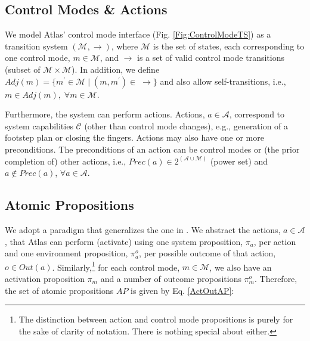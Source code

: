 
\subsection{Control Modes \& Actions}\label{S:CMActions}

We model Atlas' control mode interface (Fig. \ref{Fig:ControlModeTS}) as a transition system $(\mathcal{M}, \boldsymbol\rightarrow)$, where $\mathcal{M}$ is the set of states, each corresponding to one control mode, $m \in \mathcal{M}$, and $\boldsymbol\rightarrow$ is a set of valid control mode transitions (subset of $\mathcal{M} \times \mathcal{M}$).
In addition, we define $Adj(m) = \{ m^\prime \in \mathcal{M} \; | \; (m, m^\prime) \in \; \boldsymbol\rightarrow \}$ and also allow self-transitions, i.e., $m \in Adj(m), \; \forall m \in \mathcal{M}$.

Furthermore, the system can perform actions. Actions, $a \in \mathcal{A}$, correspond to system capabilities $\mathcal{C}$ (other than control mode changes), e.g., generation of a footstep plan or closing the fingers.
Actions may also have one or more preconditions.
The preconditions of an action can be control modes or (the prior completion of) other actions, i.e., $Prec(a) \in 2^{(\mathcal{A} \cup \mathcal{M})}$ (power set) and $a \not \in Prec(a)$, $\forall a \in \mathcal{A}$.

\subsection{Atomic Propositions}

We adopt a paradigm that generalizes the one in \cite{Vasu2013ICRA}.
We abstract the actions, $a \in \mathcal{A}$, that Atlas can perform (activate) using one system proposition, $\pi_a$, per action and one environment proposition, $\pi_a^o$, per possible outcome of that action, $o \in Out(a)$.
Similarly,\footnote{The distinction between action and control mode propositions is purely for the sake of clarity of notation. There is nothing special about either.}
for each control mode, $m \in \mathcal{M}$, we also have an activation proposition $\pi_m$ and a number of outcome propositions $\pi_m^o$.
Therefore, the set of atomic propositions $AP$ is given by Eq. \eqref{ActOutAP}:


